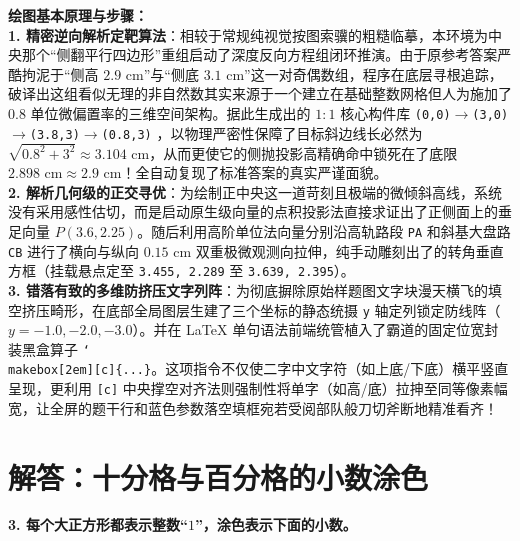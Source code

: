 {\small\color{blue!70!black}
\textbf{绘图基本原理与步骤：}\\
\textbf{1. 精密逆向解析定靶算法}：相较于常规纯视觉按图索骥的粗糙临摹，本环境为中央那个“侧翻平行四边形”重组启动了深度反向方程组闭环推演。由于原参考答案严酷拘泥于“侧高 $2.9\text{ cm}$”与“侧底 $3.1\text{ cm}$”这一对奇偶数组，程序在底层寻根追踪，破译出这组看似无理的非自然数其实来源于一个建立在基础整数网格但人为施加了 $0.8$ 单位微偏置率的三维空间架构。据此生成出的 $1:1$ 核心构件库 \texttt{(0,0)$\to$(3,0)$\to$(3.8,3)$\to$(0.8,3)} ，以物理严密性保障了目标斜边线长必然为 $\sqrt{0.8^2 + 3^2} \approx 3.104 \text{ cm}$，从而更使它的侧抛投影高精确命中锁死在了底限 $2.898 \text{ cm} \approx 2.9 \text{ cm}$！全自动复现了标准答案的真实严谨面貌。\\
\textbf{2. 解析几何级的正交寻优}：为绘制正中央这一道苛刻且极端的微倾斜高线，系统没有采用感性估切，而是启动原生级向量的点积投影法直接求证出了正侧面上的垂足向量 $P(3.6, 2.25)$。随后利用高阶单位法向量分别沿高轨路段 \texttt{PA} 和斜基大盘路 \texttt{CB} 进行了横向与纵向 $0.15\text{ cm}$ 双重极微观测向拉伸，纯手动雕刻出了的转角垂直方框（挂载悬点定至 \texttt{3.455, 2.289} 至 \texttt{3.639, 2.395}）。\\
\textbf{3. 错落有致的多维防挤压文字列阵}：为彻底摒除原始样题图文字块漫天横飞的填空挤压畸形，在底部全局图层生建了三个坐标的静态统摄 \texttt{y} 轴定列锁定防线阵（$y={-}1.0, {-}2.0, {-}3.0$）。并在 LaTeX 单句语法前端统管植入了霸道的固定位宽封装黑盒算子 \texttt{\char`\\makebox[2em][c]\{...\}}。这项指令不仅使二字中文字符（如上底/下底）横平竖直呈现，更利用 \texttt{[c]} 中央撑空对齐法则强制性将单字（如高/底）拉抻至同等像素幅宽，让全屏的题干行和蓝色参数落空填框宛若受阅部队般刀切斧断地精准看齐！
}


\newpage



\section{解答：十分格与百分格的小数涂色}

\vspace{0.4cm}

\noindent\textbf{3. 每个大正方形都表示整数“$1$”，涂色表示下面的小数。}

\vspace{0.8cm}

